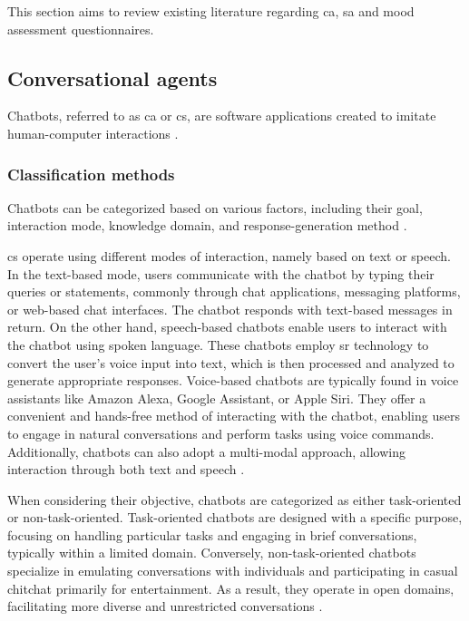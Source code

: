 \documentclass[a4paper,fleqn]{cas-dc}
\begin{document}
This section aims to review existing literature regarding \gls{ca}, \gls{sa} and mood assessment questionnaires.

\subsection{Conversational agents}
\label{conversationalAgents}

Chatbots, referred to as \gls{ca} or \gls{cs}, are software applications created to imitate human-computer interactions  \cite{montenegro_survey_2019}.

\subsubsection{Classification methods}

Chatbots can be categorized based on various factors, including their goal, interaction mode, knowledge domain, and response-generation method \cite{hussain_survey_2019}.

\gls{cs} operate using different modes of interaction, namely based on text or speech. In the text-based mode, users communicate with the chatbot by typing their queries or statements, commonly through chat applications, messaging platforms, or web-based chat interfaces. The chatbot responds with text-based messages in return. On the other hand, speech-based chatbots enable users to interact with the chatbot using spoken language. These chatbots employ \gls{sr} technology to convert the user's voice input into text, which is then processed and analyzed to generate appropriate responses. Voice-based chatbots are typically found in voice assistants like Amazon Alexa, Google Assistant, or Apple Siri. They offer a convenient and hands-free method of interacting with the chatbot, enabling users to engage in natural conversations and perform tasks using voice commands. Additionally, chatbots can also adopt a multi-modal approach, allowing interaction through both text and speech \cite{montenegro_survey_2019}.

When considering their objective, chatbots are categorized as either task-oriented or non-task-oriented. Task-oriented chatbots are designed with a specific purpose, focusing on handling particular tasks and engaging in brief conversations, typically within a limited domain. Conversely, non-task-oriented chatbots specialize in emulating conversations with individuals and participating in casual chitchat primarily for entertainment. As a result, they operate in open domains, facilitating more diverse and unrestricted conversations \cite{hussain_survey_2019}.
\end{document}
